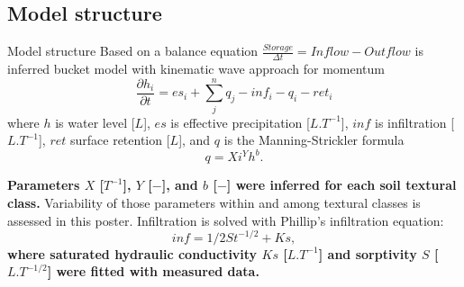 \subsection{Model structure}
\begin{block}{Model structure}
    Based on a balance equation 
    $
        \frac{Storage}{\Delta t} = \nonumber  
        Inflow - Outflow
    $
    is inferred bucket model with kinematic wave approach for momentum 
    $$
        \frac{\partial h_{i}}{\partial t} =  es_{i} + \sum_j^n q_{j} - inf_{i} - q_{i} - ret_i
    $$
    where $h$ is water level [$L$], $es$ is effective precipitation [$L.T^{-1}$], $inf$ is infiltration [$L.T^{-1}$], $ret$ surface retention [$L$], and $q$ is the Manning-Strickler formula
    \begin{equation}
      q = Xi^Yh^b. 
      \label{eq:manning}
    \end{equation}

    {\bf Parameters $X$ [$T^{-1}$], $Y$ [$-$], and $b$ [$-$] were inferred for each soil textural class.} Variability of those parameters within and among textural classes is assessed in this poster. Infiltration is solved with Phillip's infiltration equation:
    \begin{equation}
      inf = 1/2St^{-1/2} + Ks,
      \label{eq:Phillips}
    \end{equation}
    {\bf where saturated hydraulic conductivity $Ks$ [$L.T^{-1}$] and sorptivity $S$ [$L.T^{-1/2}$] were fitted with measured data.}
\end{block}



